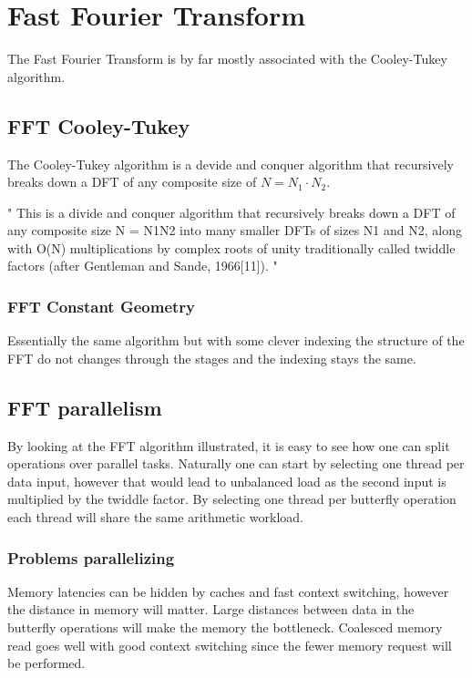 \section{Fast Fourier Transform}

The Fast Fourier Transform is by far mostly associated with the Cooley-Tukey algorithm.

\subsection{FFT Cooley-Tukey}

The Cooley-Tukey algorithm is a devide and conquer algorithm that recursively breaks down a DFT of any composite size of $N = N_1{\cdot}N_2$.  

"
This is a divide and conquer algorithm that recursively breaks down a DFT of any composite size N = N1N2 into many smaller DFTs of sizes N1 and N2, along with O(N) multiplications by complex roots of unity traditionally called twiddle factors (after Gentleman and Sande, 1966[11]).
"

\subsubsection{FFT Constant Geometry}

Essentially the same algorithm but with some clever indexing the structure of the FFT do not changes through the stages and the indexing stays the same.

\subsection{FFT parallelism}

By looking at the FFT algorithm illustrated, it is easy to see how one can split operations over parallel tasks. Naturally one can start by selecting one thread per data input, however that would lead to unbalanced load as the second input is multiplied by the twiddle factor. By selecting one thread per butterfly operation each thread will share the same arithmetic workload.

\subsubsection{Problems parallelizing}

Memory latencies can be hidden by caches and fast context switching, however the distance in memory will matter. Large distances between data in the butterfly operations will make the memory the bottleneck. Coalesced memory read goes well with good context switching since the fewer memory request will be performed.

